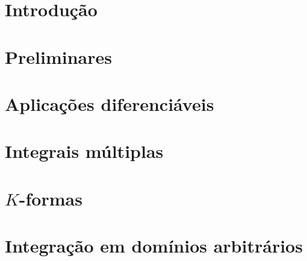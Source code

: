 \documentclass[10pt,twoside]{report}
\begin{document}



%

% 

\tableofcontents




\doublespacing
\chapter{Introdução}\label{cap-introducao}


\chapter{Preliminares}\label{cap-preliminares}


\chapter{Aplicações diferenciáveis}\label{cap-aplicacoes-diferenciaveis}


\chapter{Integrais múltiplas}\label{cap-integrais-multiplas}


\chapter{\texorpdfstring{$K$}{K}-formas}\label{cap-k-formas}


\chapter{Integração em domínios arbitrários}\label{cap-integracao-arbitraria}


%

%

{} %

\nocite{*}
\end{document}
